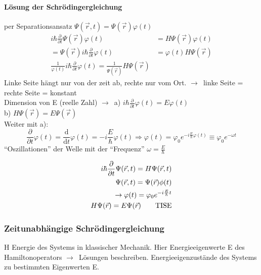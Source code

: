\documentclass[oneside]{book}
\theoremstyle{definition}
\newcommand{\conseq}{$\rightarrow$~}
\renewcommand{\d}{\mathrm d}
\newcommand{\dd}[1]{\frac{\d}{\d #1}}
\newcommand{\fpartial}[1]{\frac{\partial}{\partial #1}}
\newcommand{\vp}{\varphi}
\begin{document}
\paragraph{Lösung der Schrödingergleichung} per Separationsansatz $\Psi(\vec{r}, t) = \Psi(\vec{r}) \vp(t)$
\begin{align*}
	i \hbar \fpartial{t} \Psi(\vec{r}) \vp(t) &= H \Psi(\vec{r}) \vp(t)\\
	= \Psi(\vec{r}) i \hbar \fpartial{t} \vp(t) &= \vp(t) H \Psi(\vec{r})\\
	\frac{1}{\vp(t)} i \hbar \fpartial{t} \vp(t) = \frac{1}{\Psi(\vec{r})} H \Psi(\vec{r})
\end{align*}
Linke Seite hängt nur von der zeit ab, rechte nur vom Ort. \conseq linke Seite = rechte Seite = konstant\\
Dimension von E (reelle Zahl)
\conseq a) $i \hbar \fpartial{t} \vp(t) = E \vp(t)$\\
b) $H \Psi(\vec{r}) = E \Psi(\vec{r})$\\
Weiter mit a):
$$\fpartial{t} \vp(t) = \dd{t} \vp(t) = - i \frac{E}{\hbar} \vp(t) \Rightarrow \vp(t) = \vp_0 e^{-i\frac{E}{\hbar} \vp(t)} \equiv \vp_0 e^{- \omega t}$$
"`Oszillationen"' der Welle mit der "`Frequenz"' $\omega = \frac{E}{\hbar}$

\begin{align*}
i \hbar \fpartial{t} \Psi(\vec{r}, t) = H \Psi(\vec{r}, t)\\
\Psi(\vec{r}, t) = \Psi(\vec{r}) \phi(t)\\
\rightarrow \vp(t) = \vp_0 e^{-i\frac{E}{\hbar}t}\\
H\Psi(\vec{r}) = E \Psi(\vec{r}) \text{\qquad TISE}
\end{align*}
\subsubsection{Zeitunabhängige Schrödingergleichung}
H Energie des Systems in klassischer Mechanik. Hier Energieeigenwerte E des Hamiltonoperators \conseq Lösungen beschreiben. Energieeigenzustände des Systems zu bestimmten Eigenwerten E.
\end{document}

